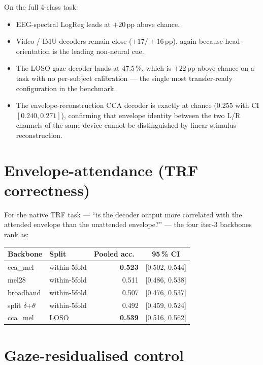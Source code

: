 On the full 4-class task:
\begin{itemize}
  \item EEG-spectral LogReg leads at $+20$\,pp above chance.
  \item Video / IMU decoders remain close ($+17/+16$\,pp), again
        because head-orientation is the leading non-neural cue.
  \item The LOSO gaze decoder lands at 47.5\,\%, which is
        $+22$\,pp above chance on a task with no per-subject calibration
        — the single most transfer-ready configuration in the benchmark.
  \item The envelope-reconstruction CCA decoder is exactly at chance
        (0.255 with CI $[0.240, 0.271]$), confirming that envelope
        identity between the two L/R channels of the same device
        cannot be distinguished by linear stimulus-reconstruction.
\end{itemize}

\section{Envelope-attendance (TRF correctness)}

For the native TRF task — ``is the decoder output more correlated with
the attended envelope than the unattended envelope?'' — the four iter-3
backbones rank as:

\begin{table}[ht]
\centering
\begin{tabular}{llrc}
\toprule
Backbone & Split & Pooled acc.\ & 95\,\% CI \\
\midrule
cca\_mel         & within-5fold & \textbf{0.523} & [0.502, 0.544] \\
mel28            & within-5fold & 0.511 & [0.486, 0.538] \\
broadband        & within-5fold & 0.507 & [0.476, 0.537] \\
split $\delta$+$\theta$ & within-5fold & 0.492 & [0.459, 0.524] \\
\midrule
cca\_mel         & LOSO         & \textbf{0.539} & [0.516, 0.562] \\
\bottomrule
\end{tabular}
\end{table}

\section{Gaze-residualised control}

